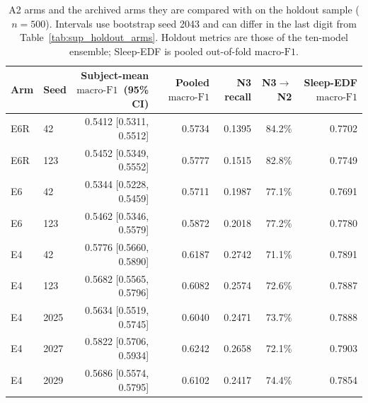 \documentclass[10pt,a4paper]{article}
\newcommand{\mf}{\ensuremath{\mathrm{macro\text{-}F1}}}
\newcommand{\ci}{95\% CI}
\begin{document}
\begin{table}[H]
\centering\small
\caption{A2 arms and the archived arms they are compared with on the holdout sample ($n=500$). Intervals
use bootstrap seed 2043 and can differ in the last digit from Table~\ref{tab:sup_holdout_arms}. Holdout
metrics are those of the ten-model ensemble; Sleep-EDF is pooled out-of-fold \mf.}
\label{tab:sup_a2_arms}
\begin{tabular}{llrrrrr}
\toprule
Arm & Seed & Subject-mean \mf\ (\ci) & Pooled \mf & N3 recall & N3$\to$N2 & Sleep-EDF \mf \\
\midrule
E6R & 42 & 0.5412 [0.5311, 0.5512] & 0.5734 & 0.1395 & 84.2\% & 0.7702 \\
E6R & 123 & 0.5452 [0.5349, 0.5552] & 0.5777 & 0.1515 & 82.8\% & 0.7749 \\
E6 & 42 & 0.5344 [0.5228, 0.5459] & 0.5711 & 0.1987 & 77.1\% & 0.7691 \\
E6 & 123 & 0.5462 [0.5346, 0.5579] & 0.5872 & 0.2018 & 77.2\% & 0.7780 \\
\addlinespace
E4 & 42 & 0.5776 [0.5660, 0.5890] & 0.6187 & 0.2742 & 71.1\% & 0.7891 \\
E4 & 123 & 0.5682 [0.5565, 0.5796] & 0.6082 & 0.2574 & 72.6\% & 0.7887 \\
E4 & 2025 & 0.5634 [0.5519, 0.5745] & 0.6040 & 0.2471 & 73.7\% & 0.7888 \\
E4 & 2027 & 0.5822 [0.5706, 0.5934] & 0.6242 & 0.2658 & 72.1\% & 0.7903 \\
E4 & 2029 & 0.5686 [0.5574, 0.5795] & 0.6102 & 0.2417 & 74.4\% & 0.7854 \\
\bottomrule
\end{tabular}
\end{table}
\end{document}
